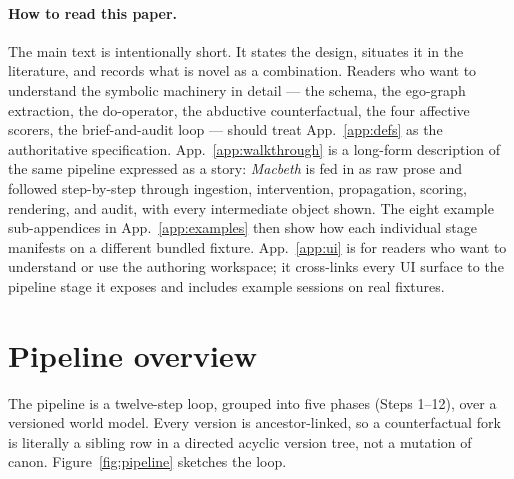 \documentclass[11pt]{article}
\begin{document}
\paragraph{How to read this paper.} The main text is intentionally
short. It states the design, situates it in the literature, and
records what is novel as a combination. Readers who want to
understand the symbolic machinery in detail --- the schema, the
ego-graph extraction, the do-operator, the abductive
counterfactual, the four affective scorers, the brief-and-audit
loop --- should treat App.~\ref{app:defs} as the authoritative
specification. App.~\ref{app:walkthrough} is a long-form
description of the same pipeline expressed as a story:
\emph{Macbeth} is fed in as raw prose and followed step-by-step
through ingestion, intervention, propagation, scoring, rendering,
and audit, with every intermediate object shown. The eight
example sub-appendices in App.~\ref{app:examples} then show how
each individual stage manifests on a different bundled fixture.
App.~\ref{app:ui} is for readers who want to understand or use the
authoring workspace; it cross-links every UI surface to the
pipeline stage it exposes and includes example sessions on real
fixtures.


\section{Pipeline overview}
\label{sec:pipeline}

The pipeline is a twelve-step loop, grouped into five phases (Steps
1--12), over a versioned world model.
Every version is ancestor-linked, so a counterfactual fork is
literally a sibling row in a directed acyclic version tree, not a
mutation of canon. Figure~\ref{fig:pipeline} sketches the loop.
\end{document}
